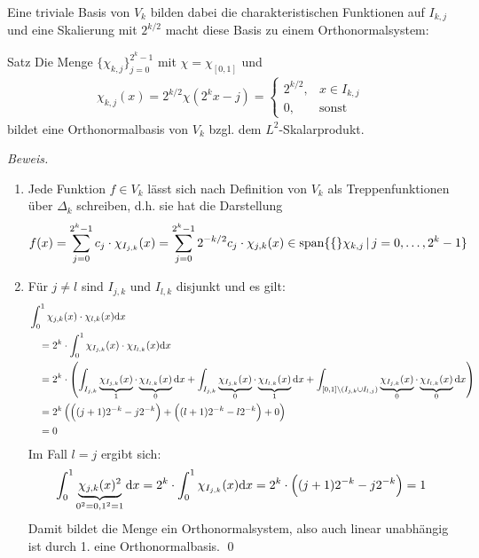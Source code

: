 Eine triviale Basis von $V_k$ bilden dabei die charakteristischen Funktionen auf $I_{k,j}$ und eine Skalierung 
mit $2^{k/2}$ macht diese Basis zu einem Orthonormalsystem:

\begin{colbox}{Satz}\label{satz:chiOrthonorm}
  Die Menge $\{\chi_{k,j}\}_{j=0}^{2^k-1}$ mit $\chi = \chi_{[0,1]}$ und
  \begin{align*}
    \chi_{k,j}(x) = 2^{k/2}\chi(2^kx-j) = \begin{cases}
      2^{k/2}, &x\in I_{k,j}\\
      0, &\text{sonst}
    \end{cases} 
  \end{align*}
  bildet eine Orthonormalbasis von $V_k$ bzgl. dem $L^2$-Skalarprodukt.
\end{colbox}
\textit{Beweis.}
\begin{enumerate}
  \item Jede Funktion $f\in V_k$ lässt sich nach Definition von $V_k$ als Treppenfunktionen über $\Delta_k$ schreiben, 
  d.h. sie hat die Darstellung 
  \begin{align*}
    f(x) 
    = \sum_{j=0}^{2^k-1} c_j\cdot \chi_{I_{j,k}}(x)
    = \sum_{j=0}^{2^k-1} 2^{-k/2}c_j\cdot \chi_{j,k}(x) \in 
    \text{span}\{\{\}\chi_{k,j} \,|\, j=0,\dots,2^k-1\}
  \end{align*}
  \item Für $j\neq l$ sind $I_{j,k}$ und $I_{l,k}$ disjunkt und es gilt:
  \begin{align*}
    &\int_{0}^{1} \chi_{j,k}(x) \cdot \chi_{l,k}(x) \text{d} x \\
    &\quad = 2^{k}\cdot \int_{0}^{1} \chi_{I_{j,k}}(x) \cdot \chi_{I_{l,k}}(x) \text{d} x \\
    &\quad = 2^{k}\cdot\left(
      \int_{I_{j,k}} \underbrace{\chi_{I_{j,k}}(x)}_{1} \cdot \underbrace{\chi_{I_{l,k}}(x)}_{0} \text{d} x
      + \int_{I_{j,k}} \underbrace{\chi_{I_{j,k}}(x)}_{0} \cdot \underbrace{\chi_{I_{l,k}}(x)}_{1} \text{d} x
      + \int_{[0,1]\backslash(I_{j,k}\cup I_{l,j})} 
      \underbrace{\chi_{I_{j,k}}(x)}_{0} \cdot \underbrace{\chi_{I_{l,k}}(x)}_{0}  \text{d} x
    \right) \\
    &\quad = 2^{k} \left(\Big((j+1)2^{-k} - j2^{-k}\Big) + \Big((l+1)2^{-k} - l2^{-k}\Big) + 0\right) \\
    &\quad = 0
  \end{align*}
  Im Fall $l=j$ ergibt sich:
  \begin{align*}
    \int_{0}^{1} \underbrace{\chi_{j,k}(x)^2}_{0^2=0, 1^2=1} \text{d} x 
    = 2^k \cdot \int_{0}^{1} \chi_{I_{j,k}}(x) \text{d} x 
    = 2^k \cdot \Big((j+1)2^{-k} - j2^{-k}\Big) 
    = 1
  \end{align*}
  Damit bildet die Menge ein Orthonormalsystem, also auch linear unabhängig ist durch 1. eine Orthonormalbasis.
  \qed
\end{enumerate}

